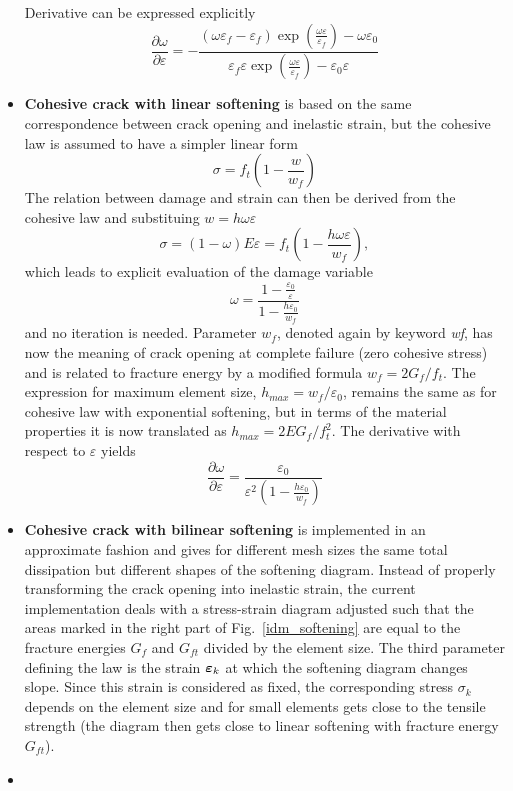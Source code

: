 \documentclass[a4paper]{article}
\newcommand{\mbf}[1]{\mbox{\boldmath$#1$}}
\newcommand{\eps} {\mbf{\varepsilon}}
\begin{document}
\begin{itemize}
Derivative can be expressed explicitly
$$
\frac{\partial\omega}{\partial\varepsilon} = - \frac{(\omega \varepsilon_f  - \varepsilon_f) \exp \left ( \frac{\omega \varepsilon}{\varepsilon_f}\right ) - \omega \varepsilon_0}{\varepsilon_f \varepsilon \exp \left ( \frac{\omega \varepsilon}{\varepsilon_f}\right ) - \varepsilon_0 \varepsilon}
$$


\item
{\bf Cohesive crack with linear softening} is based on the same correspondence
between crack opening and inelastic strain, but the cohesive law is assumed
to have a simpler linear form
$$
\sigma = f_t\left(1-\frac{w}{w_f}\right)
$$
The relation between damage and strain can then be derived from the cohesive law and 
substituing $w=h \omega \varepsilon$
$$
\sigma = (1-\omega)E\varepsilon =  f_t\left(1-\frac{h \omega \varepsilon}{w_f}\right),
$$
which leads to explicit evaluation of the damage variable
$$
\omega=\frac{1-\displaystyle\frac{\varepsilon_0}{\varepsilon}}{1-\displaystyle\frac{h\varepsilon_0}{w_f}}
$$
and no iteration is needed. Parameter $w_f$,
denoted again by keyword {\it wf}, has now the meaning of crack opening
at complete failure (zero cohesive stress) and is related to fracture energy by
a modified formula $w_f=2G_f/f_t$.
The expression for maximum element size, $h_{max}=w_f/\varepsilon_0$, remains
the same as for cohesive law with exponential softening, but in terms
of the material properties it is now translated as $h_{max}=2EG_f/f_t^2$. The derivative
with respect to $\varepsilon$ yields
$$
\frac{\partial\omega}{\partial\varepsilon} = \frac{\varepsilon_0}{\varepsilon^2 \left ( 1-\frac{h \varepsilon_0}{w_f}\right )}
$$
\item
{\bf Cohesive crack with bilinear softening} is implemented in an
approximate fashion and gives for different mesh sizes the same
total dissipation but different shapes of the softening diagram.
Instead of properly transforming the crack opening into inelastic strain,
the current implementation deals with a stress-strain diagram adjusted
such that the areas marked in the right part of Fig.~\ref{idm_softening}
are equal to the fracture energies $G_f$ and $G_{ft}$ divided by the
element size. The third parameter defining the law is the strain
$\eps_k$ at which the softening diagram changes slope. Since this
strain is considered as fixed, the corresponding stress $\sigma_k$
depends on the element size and for small elements gets close to the
tensile strength (the diagram then gets close to linear softening
with fracture energy  $G_{ft}$). 
\item

\end{itemize}
\end{document}

